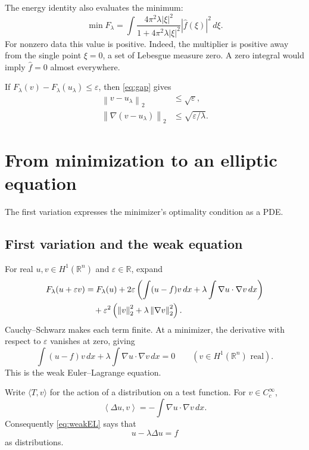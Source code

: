 \documentclass[11pt]{article}
\numberwithin{equation}{section}
\theoremstyle{definition}
\theoremstyle{remark}
\newcommand{\R}{\mathbb R}
\newcommand{\dd}{\,d}
\newcommand{\norm}[1]{\left\|#1\right\|}
\newcommand{\ip}[2]{\left\langle #1,#2\right\rangle}
\newcommand{\wh}[1]{\widehat{#1}}
\begin{document}
The energy identity also evaluates the minimum:
\begin{equation}\label{eq:minimum}
 \min F_\lambda
   =\int\frac{4\pi^2\lambda|\xi|^2}
                    {1+4\pi^2\lambda|\xi|^2}|\wh f(\xi)|^2\dd\xi.
\end{equation}
For nonzero data this value is positive. Indeed, the multiplier is positive away from the single point \(\xi=0\), a set of Lebesgue measure zero. A zero integral would imply \(\wh f=0\) almost everywhere.

If \(F_\lambda(v)-F_\lambda(u_\lambda)\le\varepsilon\), then \eqref{eq:gap} gives
\begin{align*}
 \norm{v-u_\lambda}_2&\le\sqrt\varepsilon,\\
 \norm{\nabla(v-u_\lambda)}_2&\le\sqrt{\varepsilon/\lambda}.
\end{align*}


\section{From minimization to an elliptic equation}\label{sec:variation}
The first variation expresses the minimizer's optimality condition as a PDE.

\subsection{First variation and the weak equation}
For real \(u,v\in H^1(\R^n)\) and \(\varepsilon\in\R\), expand
\begin{align}\label{eq:variation}
 F_\lambda(u+\varepsilon v)
 &=F_\lambda(u)
   +2\varepsilon\left(\int(u-f)v\dd x
                  +\lambda\int\nabla u\cdot\nabla v\dd x\right)\notag\\
 &\quad+\varepsilon^2\left(\norm v_2^2
                         +\lambda\norm{\nabla v}_2^2\right).
\end{align}
Cauchy--Schwarz makes each term finite. At a minimizer, the derivative with respect to \(\varepsilon\) vanishes at zero, giving
\begin{equation}\label{eq:weakEL}
 \int(u-f)v\dd x+\lambda\int\nabla u\cdot\nabla v\dd x=0
              \qquad(v\in H^1(\R^n)\text{ real}).
\end{equation}
This is the weak Euler--Lagrange equation.

Write \(\langle T,v\rangle\) for the action of a distribution on a test function. For \(v\in C_c^\infty\),
\[
 \ip{\Delta u}{v}=-\int\nabla u\cdot\nabla v\dd x.
\]
Consequently \eqref{eq:weakEL} says that
\begin{equation}\label{eq:ELpde}
 u-\lambda\Delta u=f
\end{equation}
as distributions.
\end{document}
